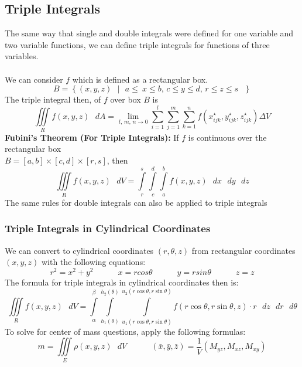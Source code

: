 \documentclass[11pt]{article}
\begin{document}
\subsection{Triple Integrals}
The same way that single and double integrals were defined for one variable and two variable functions, we can define triple integrals for functions of three variables. \\ \\
We can consider $f$ which is defined as a rectangular box.
$$ B = \left\lbrace (x,y,z) \text{ } | \text{ } a \leq\ x \leq b \text{, } c \leq y \leq d \text{, } r \leq z \leq s \text{ }\right\rbrace$$ The triple integral then, of $f$ over box $B$ is 
$$\iiint\limits_{R} f(x,y,z)\text{ }dA = \lim_{l \text{, } m \text{, } n \to 0} \sum_{i=1}^{l} \sum_{j=1}^{m} \sum_{k=1}^{n} f(x_{ijk}^{\star}, y_{ijk}^{\star}, z_{ijk}^{\star}) \Delta V$$
\textbf{Fubini's Theorem (For Triple Integrals):} If $f$ is continuous over the rectangular box \\ $B = [a,b] \times [c,d] \times [r,s]$, then 
$$\iiint\limits_{R} f(x,y,z)\text{ }dV = \int\limits_{r}^{s} \int\limits_{c}^{d} \int\limits_{a}^{b} f(x,y,z)\text{ }dx\text{ }dy\text{ }dz $$
The same rules for double integrals can also be applied to triple integrals
\subsubsection{Triple Integrals in Cylindrical Coordinates}
We can convert to cylindrical coordinates $(r, \theta,z)$ from rectangular coordinates $(x,y,z)$ with the following equations:
$$r^2 = x^2 + y^2 \quad \quad \quad x = rcos\theta \quad \quad \quad y = rsin\theta \quad \quad \quad z=z$$
The formula for triple integrals in cylindrical coordinates then is:
$$\iiint\limits_{R} f(x,y,z)\text{ }dV = \int\limits_{\alpha}^{\beta} \int\limits_{h_1(\theta)}^{h_2(\theta)} \int\limits_{u_1(r\cos \theta, r\sin \theta)}^{u_2(r\cos \theta, r\sin \theta)} f(r\cos \theta,r \sin \theta,z)\cdot r \text{ }dz\text{ }dr\text{ }d\theta $$
To solve for center of mass questions, apply the following formulas: $$ m =\iiint\limits_{E} \rho(x,y,z)\text{ }dV \quad \quad \quad (\bar{x}, \bar{y}, \bar{z}) = \frac{1}{V}(M_{yz}, M_{xz}, M_{xy})$$
\end{document}
